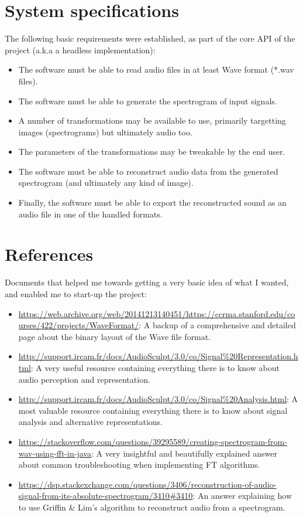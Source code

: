 \documentclass{article}
\begin{document}
\section{System specifications}
    The following basic requirements were established, as part of the core API of the project (a.k.a a headless implementation):
    \begin{itemize}
        \item The software must be able to read audio files in at least Wave format (*.wav files).
        \item The software must be able to generate the spectrogram of input signals.
        \item A number of transformations may be available to use, primarily targetting images (spectrograms) but ultimately audio too.
        \item The parameters of the transformations may be tweakable by the end user.
        \item The software must be able to reconstruct audio data from the generated spectrogram (and ultimately any kind of image).
        \item Finally, the software must be able to export the reconstructed sound as an audio file in one of the handled formats.
    \end{itemize}

\section{References}
    Documents that helped me towards getting a very basic idea of what I wanted, and enabled me to start-up the project:\\
    \begin{itemize}
        \item \url{https://web.archive.org/web/20141213140451/https://ccrma.stanford.edu/courses/422/projects/WaveFormat/}: A backup of a comprehensive and detailed page about the binary layout of the Wave file format.
        \item \url{http://support.ircam.fr/docs/AudioSculpt/3.0/co/Signal%20Representation.html}: A very useful resource containing everything there is to know about audio perception and representation.
        \item \url{http://support.ircam.fr/docs/AudioSculpt/3.0/co/Signal%20Analysis.html}: A most valuable resource containing everything there is to know about signal analysis and alternative representations.
        \item \url{https://stackoverflow.com/questions/39295589/creating-spectrogram-from-wav-using-fft-in-java}: A very insightful and beautifully explained answer about common troubleshooting when implementing FT algorithms.
        \item \url{https://dsp.stackexchange.com/questions/3406/reconstruction-of-audio-signal-from-its-absolute-spectrogram/3410#3410}: An answer explaining how to use Griffin & Lim's algorithm to reconstruct audio from a spectrogram.
    \end{itemize}
\end{document}
